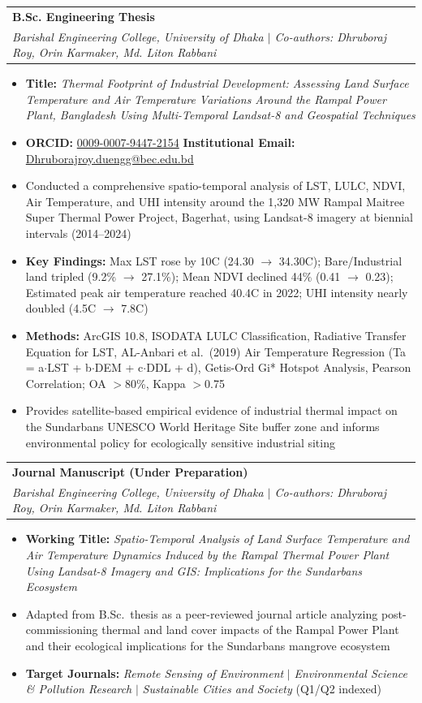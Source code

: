 \documentclass[letterpaper,11pt]{article}
\makeatletter
\newcommand{\resumeItem}[1]{
  \item\small{#1 \vspace{-2pt}}
}
\newcommand{\resumeSubheading}[4]{
  \vspace{-2pt}\item
    \begin{tabular*}{0.97\textwidth}[t]{l@{\extracolsep{\fill}}r}
      \textbf{#1} & \small #2 \\
      \textit{\small#3} & \textit{\small #4} \\
    \end{tabular*}\vspace{-7pt}
}
\newcommand{\resumeItemListStart}{\begin{itemize}}
\newcommand{\resumeItemListEnd}{\end{itemize}\vspace{-5pt}}
\makeatother
\begin{document}
    \resumeSubheading
      {B.Sc. Engineering Thesis}{}
      {Barishal Engineering College, University of Dhaka $|$ Co-authors: Dhruboraj Roy, Orin Karmaker, Md. Liton Rabbani}{}
      \resumeItemListStart
        \resumeItem{\textbf{Title:} \textit{Thermal Footprint of Industrial Development: Assessing Land Surface Temperature and Air Temperature Variations Around the Rampal Power Plant, Bangladesh Using Multi-Temporal Landsat-8 and Geospatial Techniques}}
        \resumeItem{\textbf{ORCID:} \href{https://orcid.org/0009-0007-9447-2154}{0009-0007-9447-2154} \quad \textbf{Institutional Email:} \href{mailto:Dhruborajroy.duengg@bec.edu.bd}{Dhruborajroy.duengg@bec.edu.bd}}
        \resumeItem{Conducted a comprehensive spatio-temporal analysis of LST, LULC, NDVI, Air Temperature, and UHI intensity around the 1,320 MW Rampal Maitree Super Thermal Power Project, Bagerhat, using Landsat-8 imagery at biennial intervals (2014--2024)}
        \resumeItem{\textbf{Key Findings:} Max LST rose by 10\textdegree C (24.30 $\to$ 34.30\textdegree C); Bare/Industrial land tripled (9.2\% $\to$ 27.1\%); Mean NDVI declined 44\% (0.41 $\to$ 0.23); Estimated peak air temperature reached 40.4\textdegree C in 2022; UHI intensity nearly doubled (4.5\textdegree C $\to$ 7.8\textdegree C)}
        \resumeItem{\textbf{Methods:} ArcGIS 10.8, ISODATA LULC Classification, Radiative Transfer Equation for LST, AL-Anbari et al.\ (2019) Air Temperature Regression (Ta = a$\cdot$LST + b$\cdot$DEM + c$\cdot$DDL + d), Getis-Ord Gi* Hotspot Analysis, Pearson Correlation; OA $>$80\%, Kappa $>$0.75}
        \resumeItem{Provides satellite-based empirical evidence of industrial thermal impact on the Sundarbans UNESCO World Heritage Site buffer zone and informs environmental policy for ecologically sensitive industrial siting}
      \resumeItemListEnd

    \vspace{2pt}

    \resumeSubheading
      {Journal Manuscript (Under Preparation)}{}
      {Barishal Engineering College, University of Dhaka $|$ Co-authors: Dhruboraj Roy, Orin Karmaker, Md. Liton Rabbani}{}
      \resumeItemListStart
        \resumeItem{\textbf{Working Title:} \textit{Spatio-Temporal Analysis of Land Surface Temperature and Air Temperature Dynamics Induced by the Rampal Thermal Power Plant Using Landsat-8 Imagery and GIS: Implications for the Sundarbans Ecosystem}}
        \resumeItem{Adapted from B.Sc.\ thesis as a peer-reviewed journal article analyzing post-commissioning thermal and land cover impacts of the Rampal Power Plant and their ecological implications for the Sundarbans mangrove ecosystem}
        \resumeItem{\textbf{Target Journals:} \textit{Remote Sensing of Environment} $|$ \textit{Environmental Science \& Pollution Research} $|$ \textit{Sustainable Cities and Society} (Q1/Q2 indexed)}
      \resumeItemListEnd
\end{document}
